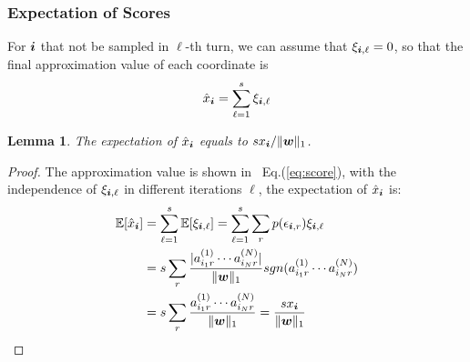 \documentclass[letterpaper]{article}
\newcommand{\Sca}[3]{{#1}^{(#2)}_{i_#2#3}}%
\newcommand{\anr}[2]{\Sca{a}{#1}{#2}}
\newcommand{\score}[1]{\xi_{\V{i},#1}}
\newcommand{\V}[1]{{\boldsymbol{{\MakeLowercase{#1}}}}}
\newcommand{\norm}[2]{\|#1\|_{#2}}
\newcommand{\Eqn}[1]   {Eq.(\ref{eq:#1})}
\newcommand{\predx}{\hat{x}_{\V{i}}}
\newtheorem{lemma}{Lemma}
\begin{document}
\subsubsection{Expectation of Scores}
For $\V{i}$ that not be sampled in $\ell$-th turn,
we can assume that $\score{\ell}=0$,
so that the final approximation value of each coordinate is
\begin{equation}\label{eq:score}
\predx = \sum_{\ell=1}^{s} \score{\ell}
\end{equation}

\begin{lemma}\label{lem:Expectation}
The expectation of $\predx$ equals to $sx_{\V{i}}/\norm{\V{w}}{1}$.
\end{lemma}
\begin{proof}
    The approximation value is shown in ~\Eqn{score},
    with the independence of $\score{\ell}$ in different iterations $\ell$,
    the expectation of $\hat{x}_{\V{i}}$ is:
\begin{align*}
\mathbb{E}[\predx]
& = \sum_{\ell=1}^{s}\mathbb{E}[\score{\ell}] = \sum_{\ell=1}^{s}\sum_{r} p(\epsilon_{\V{i},r})\score{\ell} \\
& = s\sum_{r} \frac{|\anr{1}{r}\cdots\anr{N}{r}|}{\norm{\V{W}}{1}}
                  sgn(\anr{1}{r}\cdots\anr{N}{r})\\
& = s\sum_{r} \frac{\anr{1}{r}\cdots\anr{N}{r}}{\norm{\V{W}}{1}}
  = \frac{sx_{\V{i}}}{\norm{\V{w}}{1}}
\end{align*}
\end{proof}
\end{document}

